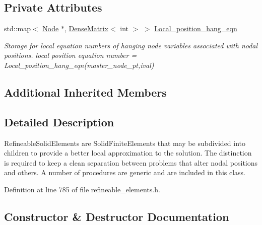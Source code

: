\subsection*{Private Attributes}
\begin{DoxyCompactItemize}
\item 
std\+::map$<$ \hyperlink{classoomph_1_1Node}{Node} $\ast$, \hyperlink{classoomph_1_1DenseMatrix}{Dense\+Matrix}$<$ int $>$ $>$ \hyperlink{classoomph_1_1RefineableSolidElement_ac12e9c9ea5a0f1f87cadaaec9d7d8fe9}{Local\+\_\+position\+\_\+hang\+\_\+eqn}
\begin{DoxyCompactList}\small\item\em Storage for local equation numbers of hanging node variables associated with nodal positions. local position equation number = Local\+\_\+position\+\_\+hang\+\_\+eqn(master\+\_\+node\+\_\+pt,ival) \end{DoxyCompactList}\end{DoxyCompactItemize}
\subsection*{Additional Inherited Members}


\subsection{Detailed Description}
Refineable\+Solid\+Elements are Solid\+Finite\+Elements that may be subdivided into children to provide a better local approximation to the solution. The distinction is required to keep a clean separation between problems that alter nodal positions and others. A number of procedures are generic and are included in this class. 

Definition at line 785 of file refineable\+\_\+elements.\+h.



\subsection{Constructor \& Destructor Documentation}
\mbox{\label{classoomph_1_1RefineableSolidElement_a7e30a2a6c56a69a37ce327a2cfb69e40}} 
